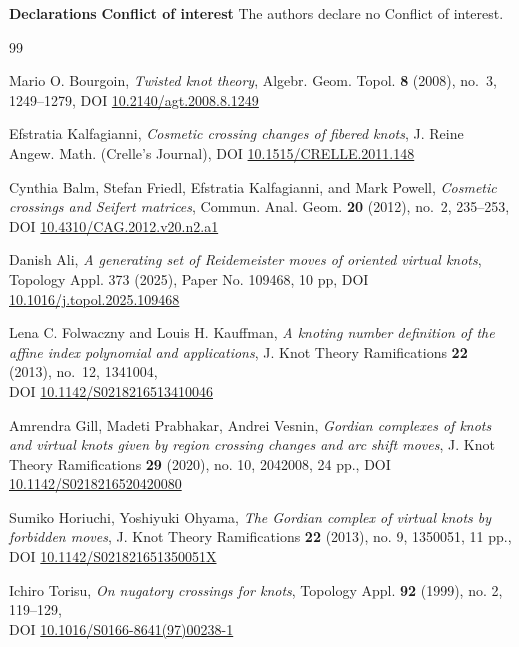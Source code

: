 \documentclass[10pt,a4paper,reqno]{amsart}
\theoremstyle{definition}
\theoremstyle{remark}
\begin{document}
\textbf{Declarations}
\textbf{Conflict of interest} The authors declare no Conflict of
interest.
	
\begin{thebibliography}{99}
	
	Mario O. Bourgoin, \textit{Twisted knot theory}, Algebr. Geom. Topol. \textbf{8} (2008), no.~3, 1249--1279,
	DOI \href{https://doi.org/10.2140/agt.2008.8.1249}{10.2140/agt.2008.8.1249}
	
	Efstratia Kalfagianni, \textit{Cosmetic crossing changes of fibered knots}, J. Reine Angew. Math. (Crelle's Journal), DOI \href{https://doi.org/10.1515/CRELLE.2011.148}{10.1515/CRELLE.2011.148}
	
	Cynthia Balm, Stefan Friedl, Efstratia Kalfagianni, and Mark Powell,
	\textit{Cosmetic crossings and Seifert matrices}, Commun. Anal. Geom. \textbf{20} (2012), no.~2, 235--253,\\
	DOI \href{https://dx.doi.org/10.4310/CAG.2012.v20.n2.a1}{10.4310/CAG.2012.v20.n2.a1}
	
	Danish Ali, \textit{A generating set of Reidemeister moves of oriented virtual knots},
	Topology Appl. 373 (2025), Paper No. 109468, 10 pp, DOI \href{https://doi.org/10.1016/j.topol.2025.109468}{10.1016/j.topol.2025.109468}
	
	Lena C. Folwaczny and Louis H. Kauffman, \textit{A knoting number definition of the affine index polynomial and applications}, J. Knot Theory Ramifications \textbf{22} (2013), no.~12, 1341004,\\
	DOI \href{https://doi.org/10.1142/S0218216513410046}{10.1142/S0218216513410046}
	
	
	Amrendra Gill, Madeti Prabhakar, Andrei Vesnin, {\it Gordian complexes of knots and virtual knots given by region crossing changes and arc shift moves}, J. Knot Theory Ramifications \textbf{29} (2020), no. 10, 2042008, 24 pp., DOI \href{https://doi.org/10.1142/S0218216520420080}{10.1142/S0218216520420080}
	

	Sumiko Horiuchi,  Yoshiyuki Ohyama, {\it The Gordian complex of virtual knots by forbidden moves}, J. Knot Theory Ramifications \textbf{22} (2013), no. 9, 1350051, 11 pp., \\
	DOI \href{https://doi.org/10.1142/S021821651350051X}{10.1142/S021821651350051X}
	
Ichiro Torisu, {\it  On nugatory crossings for knots}, Topology Appl. \textbf{92} (1999), no. 2, 119--129,\\
 DOI \href{https://doi.org/10.1016/S0166-8641(97)00238-1}{10.1016/S0166-8641(97)00238-1}


\end{thebibliography}
\end{document}
